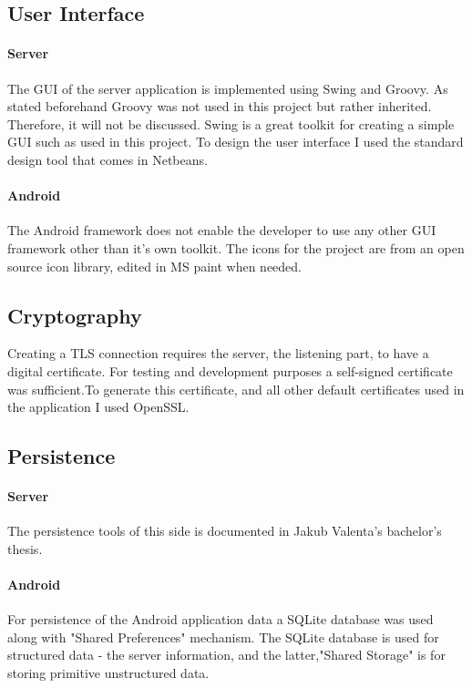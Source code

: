 \documentclass[11pt,twoside,a4paper]{book}
\begin{document}
\subsection{User Interface}
\paragraph{Server}
The GUI of the server application is implemented using Swing\cite{swing} and Groovy\cite{whatIsGroovy}. As stated beforehand Groovy was not used in this project but rather inherited. Therefore, it will not be discussed. Swing is a great toolkit for creating a simple GUI such as used in this project. To design the user interface I used the standard design tool that comes in Netbeans.
\paragraph{Android}
The Android framework does not enable the developer to use any other GUI framework other than it's own toolkit. The icons for the project are from an open source icon library\cite{iconsource}, edited in MS paint when needed.

\subsection{Cryptography}
Creating a TLS\cite{tls} connection requires the server, the listening part, to have a digital certificate. For testing and development purposes a self-signed certificate was sufficient.To generate this certificate, and all other default certificates used in the application I used OpenSSL\cite{openssl}.

\subsection{Persistence}
\paragraph{Server} The persistence tools of this side is documented in Jakub Valenta's bachelor's thesis\cite{bakalarkaJV}.
\paragraph{Android}
For persistence of the Android application data a SQLite\cite{sqlite} database was used along with "Shared Preferences"\cite{storage} mechanism. The SQLite database is used for structured data - the server information, and the latter,"Shared Storage" is for storing primitive unstructured data.
\end{document}
